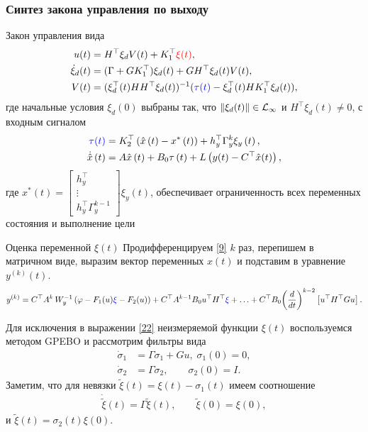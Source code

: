 \begin{frame}\frametitle{Синтез закона управления по выходу}
	\small %
	\begin{statement} \label{st2}
		Закон управления вида 
		\begin{align}\label{16}
			u(t) &= H^\top \xi_d V(t) +K_1^\top {\color{red} \xi(t)}, \\ 
			\dot \xi_d(t) &= (\Gamma +GK_1^\top)\xi_d(t) + GH^\top \xi_d(t)V(t), \\  
			V(t) &=  (\xi_d^\top(t) HH^\top \xi_d(t))^{-1} ({\color{blue} \tau(t)} - \xi_d^\top(t) HK_1^\top \xi_d(t)),
		\end{align}
		где начальные условия  $\xi_d(0)$ выбраны так, что $\|\xi_d(t)\|\in {\cal L}_\infty$ и $H^\top \xi_d(t) \neq 0$, с входным сигналом
		\begin{align}
			{\color{blue} \tau(t)} &= K_2^ \top \left( {\hat x\left( t \right) - {x^*}\left( t \right)} \right) + h_y^ \top \Gamma _y^k{\xi _y}\left( t \right),\\  \label{20}
			\dot{\hat x}\left( t \right) &= A\hat x\left( t \right) + B_0 \tau \left( t \right) + L\left(y(t) - C^\top \hat x(t)\right),
		\end{align}
		где	${x^*}\left( t \right) = \left[ {\begin{array}{*{20}{c}}
				{h_y^ \top } \\ 
				\vdots  \\ 
				{h_y^ \top \Gamma _y^{k - 1}} 
		\end{array}} \right]{\xi _y}\left( t \right)$, обеспечивает ограниченность всех переменных состояния и выполнение цели 
	\end{statement}	
\end{frame}


\begin{frame}{Оценка переменной $\xi(t)$}
	\hypertarget{slide\insertframenumber}{}
	Продифференцируем \eqref{9} $k$ раз, перепишем в матричном виде, выразим вектор переменных $x(t)$ и подставим в уравнение $y^{(k)}(t)$. 
	\begin{align}\label{22}
		y^{(k)}= C^\top A^k \, W_y^{-1} \left( \varphi - F_1(u){\color{blue} \xi} -F_2(u) \right) + C^\top A^{k-1}B_0 u^\top H^\top {\color{blue} \xi} + \ldots + {C^\top}{B_0}{\left( {\frac{d}{{dt}}} \right)^{k-2}}\left[ u^\top H^\top Gu \right].
	\end{align}
	
	Для исключения в выражении \eqref{22} неизмеряемой функции $\xi(t)$ воспользуемся методом GPEBO и рассмотрим фильтры вида
	\begin{align} \label{2.sigma1.ru}
		\dot \sigma_1 &= \Gamma \sigma_1 + Gu, \; \sigma_1(0)=0, \\
		\label{2.sigma2.ru}
		\dot \sigma_2 &= \Gamma \sigma_2, \qquad \sigma_2(0) =I.
	\end{align}
	Заметим, что для невязки $\tilde \xi(t) = \xi(t) - \sigma_1(t)$ имеем соотношение
	\begin{align*}
		\dot {\tilde {\xi}}(t)  = \Gamma \tilde \xi(t), \qquad
		\tilde \xi(0) =\xi(0),
	\end{align*}
	и $\tilde \xi(t)= \sigma_2(t)\xi(0)$. 
\end{frame}


